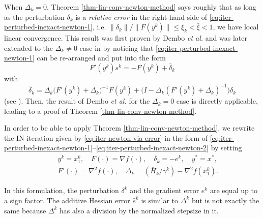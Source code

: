 \documentclass[final,numbook]{svjour3}
\begin{document}
When $\Delta_k = 0$, Theorem \ref{thm-lin-conv-newton-method} says roughly that as long as the perturbation $\delta_k$ is a \textit{relative error} in the right-hand side of \eqref{eq:iter-perturbed-inexact-newton-1}, i.e. $\|\delta_k\|/\| F(y^k) \| \leq \xi_k< \bar{\xi}<1$, we have local linear convergence. This result was first proven by Dembo \textit{et al.} \cite{DemboEisenNewton82} and was later extended to the $\Delta_k \neq 0$ case in \cite{Catinas2001Jota} by noticing that 
\eqref{eq:iter-perturbed-inexact-newton-1} can be re-arranged and put into the form 
 $$F'(y^k)s^k = -F(y^k) + \bar{\delta}_k$$
with 
 $$ \bar{\delta}_k = \Delta_k \bigg( F'(y^k)+\Delta_k \bigg)^{-1} F(y^k) + 
  \bigg( I - \Delta_k ( F'(y^k) + \Delta_k )^{-1} 
  \bigg) \delta_k $$
(see \cite[Theorem 2.2]{Catinas2001Jota}). Then, the result of Dembo \textit{et al.} for the $\Delta_k=0$ case is directly applicable, leading to a proof of Theorem \ref{thm-lin-conv-newton-method}.  

\bigskip
In order to be able to apply Theorem \ref{thm-lin-conv-newton-method}, we rewrite the IN iteration given by \eqref{eq-iter-newton-via-error} in the form of \eqref{eq:iter-perturbed-inexact-newton-1}--\eqref{eq:iter-perturbed-inexact-newton-2} by setting
\begin{eqnarray*}
	&&y^k = x_1^k, \quad F(\cdot)=\nabla f(\cdot), \quad \delta_k = -e^k, \quad y^* = x^*, \\
	&&F'(\cdot) = \nabla^2 f(\cdot),\quad \Delta_k = (\bar{H}_k/\gamma^k) - \nabla^2 f(x_1^k).     
\end{eqnarray*}
 
In this formulation, the perturbation $\delta^k$ and the gradient error $e^k$ are equal up to a sign factor. The additive Hessian error $\widehat {e}^k$ is similar to $\Delta^k$ but is not exactly the same because $\Delta^k$ has also a division by the normalized stepsize in it. 
  
\end{document}
